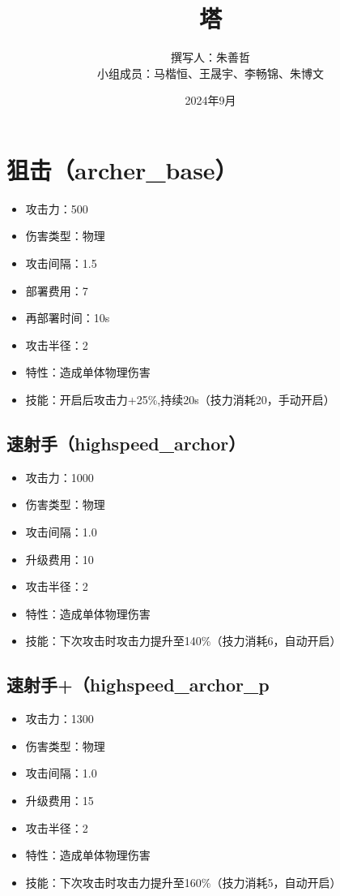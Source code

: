 \documentclass[a4paper,12pt]{article}
\begin{document}
	\title{塔}
	\author{撰写人：朱善哲\\小组成员：马楷恒、王晟宇、李畅锦、朱博文}
	\date{2024年9月}
	\maketitle
	\section{狙击（archer\_base）}
		\begin{itemize}
			\item 攻击力：500
			\item 伤害类型：物理
			\item 攻击间隔：1.5
			\item 部署费用：7
			\item 再部署时间：10s
			\item 攻击半径：2
			\item 特性：造成单体物理伤害
			\item 技能：开启后攻击力+25\%,持续20s（技力消耗20，手动开启）
		\end{itemize}
		\subsection{速射手（highspeed\_archor）}
			\begin{itemize}
				\item 攻击力：1000
				\item 伤害类型：物理
				\item 攻击间隔：1.0
				\item 升级费用：10
				\item 攻击半径：2
				\item 特性：造成单体物理伤害
				\item 技能：下次攻击时攻击力提升至140\%（技力消耗6，自动开启）
			\end{itemize}
		\subsection{速射手+（highspeed\_archor\_p}
			\begin{itemize}
				\item 攻击力：1300
				\item 伤害类型：物理
				\item 攻击间隔：1.0
				\item 升级费用：15
				\item 攻击半径：2
				\item 特性：造成单体物理伤害
				\item 技能：下次攻击时攻击力提升至160\%（技力消耗5，自动开启）
			\end{itemize}
\end{document}
